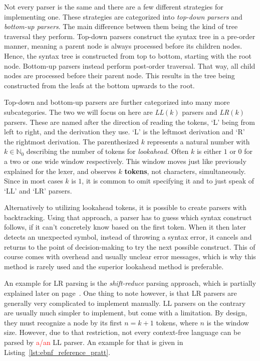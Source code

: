 Not every parser is the same and there are a few different strategies for implementing one.
These strategies are categorized into \emph{top-down parsers} and \emph{bottom-up parsers}.
The main difference between them being the kind of tree traversal they perform.
Top-down parsers construct the syntax tree in a pre-order manner, meaning a parent node is always processed before its children nodes.
Hence, the syntax tree is constructed from top to bottom, starting with the root node.
Bottom-up parsers instead perform post-order traversal.
That way, all child nodes are processed before their parent node.
This results in the tree being constructed from the leafs at the bottom upwards to the root.

Top-down and bottom-up parsers are further categorized into many more subcategories.
The two we will focus on here are \emph{LL$(k)$} parsers and \emph{LR$(k)$} parsers.
These are named after the direction of reading the tokens, `L' being from left to right, and the derivation they use.
`L' is the leftmost derivation and `R' the rightmost derivation.
The parenthesized $k$ represents a natural number with $k\in\mathbb{N}_0$ describing the number of tokens for \emph{lookahead}.
Often $k$ is either $1$ or $0$ for a two or one wide window respectively.
This window moves just like previously explained for the lexer, and observes $k$ \textbf{tokens}, not characters, simultaneously.
Since in most cases $k$ is $1$, it is common to omit specifying it and to just speak of `LL' and `LR' parsers.

Alternatively to utilizing lookahead tokens, it is possible to create parsers with backtracking.
Using that approach, a parser has to guess which syntax construct follows, if it can't concretely know based on the first token.
When it then later detects an unexpected symbol, instead of throwing a syntax error, it cancels and returns to the point of decision-making to try the next possible construct.
This of course comes with overhead and usually unclear error messages, which is why this method is rarely used and the superior lookahead method is preferable.

An example for LR parsing is the \emph{shift-reduce} parsing approach, which is partially explained later on page~\pageref{sec:parser_generators}.
One thing to note however, is that LR parsers are generally very complicated to implement manually.
LL parsers on the contrary are usually much simpler to implement, but come with a limitation.
By design, they must recognize a node by its first $n=k+1$ tokens, where $n$ is the window size.
However, due to that restriction, not every context-free language can be parsed by \textcolor{red}{a/an} LL parser.
An example for that is given in Listing~\ref{lst:ebnf_reference_pratt}.

